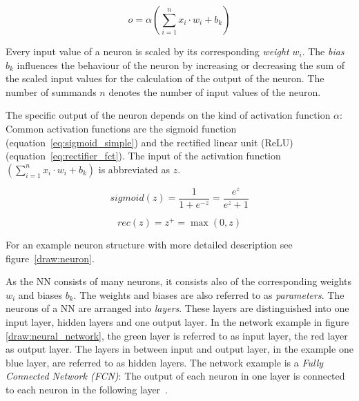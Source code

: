 \begin{equation}
o = \alpha \left(\sum_{i=1}^n x_i \cdot w_i + b_k\right)
\label{eq:output_neuron}
\end{equation}

Every input value of a neuron is scaled by its corresponding \emph{weight} $w_i$.
The \emph{bias} $b_k$ influences the behaviour of the neuron by increasing or decreasing the sum of the scaled input values for the calculation of the output of the neuron.
The number of summands $n$ denotes the number of input values of the neuron.

The specific output of the neuron depends on the kind of activation function $\alpha$:
Common activation functions are the sigmoid function (equation~\ref{eq:sigmoid_simple}) and the rectified linear unit (ReLU) (equation~\ref{eq:rectifier_fct}). The input of the activation function $\left( \sum_{i=1}^n x_i \cdot w_i + b_k\right)$ is abbreviated as $z$. %

\begin{equation}
\label{eq:sigmoid_simple}
sigmoid(z) = \frac{1}{1 + e^{-z}} = \frac{e^z}{e^z + 1}
\end{equation}

\begin{equation}
\label{eq:rectifier_fct}
rec(z) = z^+ = \max(0, z)
\end{equation}

For an example neuron structure with more detailed description see figure~\ref{draw:neuron}.

As the NN consists of many neurons, it consists also of the corresponding weights $w_i $ and biases $b_k$. The weights and biases are also referred to as \emph{parameters}.
The neurons of a NN are arranged into \emph{layers}.
These layers are distinguished into one input layer, hidden layers and one output layer.
In the network example in figure \ref{draw:neural_network}, the green layer is referred to as input layer, the red layer as output layer. The layers in between input and output layer, in the example one blue layer, are referred to as hidden layers. 
The network example is a \emph{Fully Connected Network (FCN)}: The output of each neuron in one layer is connected to each neuron in the following layer~\cite{long2015_FCNs}.

